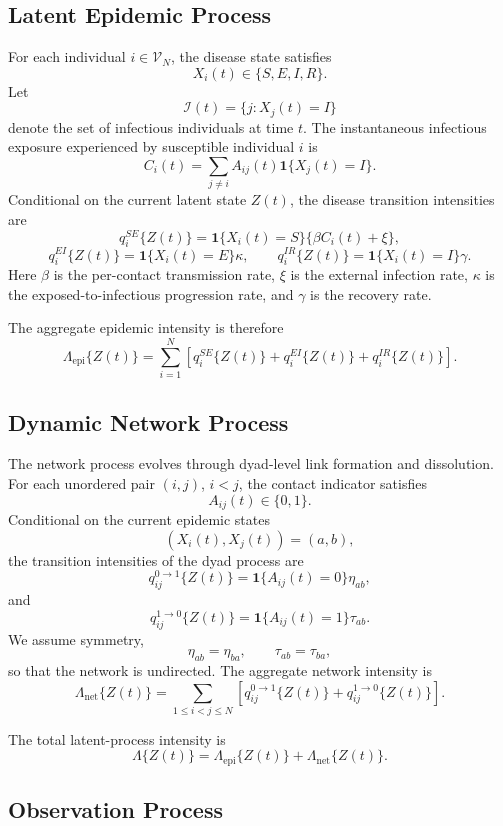\documentclass[10pt]{article}
\begin{document}
\subsection{Latent Epidemic Process}

For each individual $i\in\mathcal{V}_N$, the disease state satisfies
\[
X_i(t)\in\{S,E,I,R\}.
\]
Let
\[
\mathcal{I}(t)=\{j:X_j(t)=I\}
\]
denote the set of infectious individuals at time $t$. The instantaneous infectious exposure experienced by susceptible individual $i$ is
\[
C_i(t)=\sum_{j\neq i}A_{ij}(t)\mathbf{1}\{X_j(t)=I\}.
\]
Conditional on the current latent state $Z(t)$, the disease transition intensities are
\[
q_i^{SE}\{Z(t)\}
=
\mathbf{1}\{X_i(t)=S\}\{\beta C_i(t)+\xi\},
\]
\[
q_i^{EI}\{Z(t)\}
=
\mathbf{1}\{X_i(t)=E\}\kappa,
\qquad
q_i^{IR}\{Z(t)\}
=
\mathbf{1}\{X_i(t)=I\}\gamma.
\]
Here $\beta$ is the per-contact transmission rate, $\xi$ is the external infection rate, $\kappa$ is the exposed-to-infectious progression rate, and $\gamma$ is the recovery rate.

The aggregate epidemic intensity is therefore
\[
\Lambda_{\mathrm{epi}}\{Z(t)\}
=
\sum_{i=1}^N
\left[
q_i^{SE}\{Z(t)\}
+
q_i^{EI}\{Z(t)\}
+
q_i^{IR}\{Z(t)\}
\right].
\]

\subsection{Dynamic Network Process}

The network process evolves through dyad-level link formation and dissolution. For each unordered pair $(i,j)$, $i<j$, the contact indicator satisfies
\[
A_{ij}(t)\in\{0,1\}.
\]
Conditional on the current epidemic states
\[
(X_i(t),X_j(t))=(a,b),
\]
the transition intensities of the dyad process are
\[
q_{ij}^{0\to1}\{Z(t)\}
=
\mathbf{1}\{A_{ij}(t)=0\}\eta_{ab},
\]
and
\[
q_{ij}^{1\to0}\{Z(t)\}
=
\mathbf{1}\{A_{ij}(t)=1\}\tau_{ab}.
\]
We assume symmetry,
\[
\eta_{ab}=\eta_{ba},
\qquad
\tau_{ab}=\tau_{ba},
\]
so that the network is undirected. The aggregate network intensity is
\[
\Lambda_{\mathrm{net}}\{Z(t)\}
=
\sum_{1\le i<j\le N}
\left[
q_{ij}^{0\to1}\{Z(t)\}
+
q_{ij}^{1\to0}\{Z(t)\}
\right].
\]

The total latent-process intensity is
\[
\Lambda\{Z(t)\}
=
\Lambda_{\mathrm{epi}}\{Z(t)\}
+
\Lambda_{\mathrm{net}}\{Z(t)\}.
\]

\subsection{Observation Process}
\end{document}
